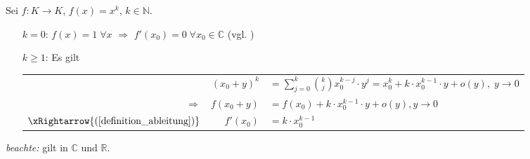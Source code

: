 \begin{example}
	Sei $f:K\to K$, $f(x) = x^k$, $k\in\mathbb{N}$.
	\begin{itemize}[leftmargin=]
		\item[$k=0$:] $f(x) = 1\;\forall x$ $\Rightarrow$ $f'(x_0) = 0\;\forall x_0\in\mathbb{C}$ (vgl. )
		\item[$k\ge 1$:] Es gilt \\
		\renewcommand{\arraystretch}{1.2}
		\begin{tabularx}{\linewidth}{r@{\ \ }r@{$\,$}X}
			& $(x_0 + y)^k$ & $\displaystyle = \sum_{j=0}^{k}\binom{k}{j} x_0^{k-j}\cdot y^j = x_0^k + k\cdot x_0^{k-1}\cdot y + o(y),\;y\to 0$ \\
			$\Rightarrow$ & $f(x_0 + y)$ & $= f(x_0) + k\cdot x_0^{k-1}\cdot y + o(y), y\to 0$ \\
			$\xRightarrow{(\ref{definition_ableitung})}$ & $f'(x_0)$ & $= k\cdot x_0^{k-1}$
		\end{tabularx}
	\end{itemize}
	\emph{beachte:} gilt in $\mathbb{C}$ und $\mathbb{R}$. \\
	\begin{center}\end{center}
\end{example}

